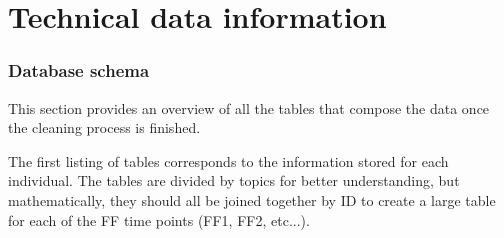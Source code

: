 \chapter{Technical data information}
\label{chapter:Annexes}

\subsection{Database schema}
\label{chapter:Annex_schema}

This section provides an overview of all the tables that compose the data once the cleaning process is finished.

The first listing of tables corresponds to the information stored for each individual. The tables are divided by topics for better understanding, but mathematically, they should all be joined together by ID to create a large table for each of the FF time points (FF1, FF2, etc...).

